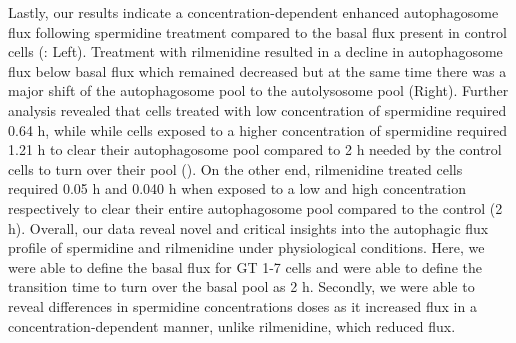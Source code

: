 {Lastly, our results indicate a concentration-dependent enhanced autophagosome flux following spermidine treatment compared to the basal flux present in control cells (: Left). Treatment with rilmenidine resulted in a decline in autophagosome flux below basal flux which remained decreased but at the same time there was a major shift of the autophagosome pool to the autolysosome pool  (Right). Further analysis revealed that cells treated with low concentration of spermidine required 0.64 h, while while cells exposed to a higher concentration of spermidine required 1.21 h to clear their autophagosome pool compared to 2 h needed by the control cells to turn over their pool (). On the other end, rilmenidine treated cells required 0.05 h and 0.040 h when exposed to a low and high concentration respectively to clear their entire autophagosome pool compared to the control (2 h). Overall, our data reveal novel and critical insights into the autophagic flux profile of spermidine and rilmenidine under physiological conditions. Here, we were able to define the basal flux for GT 1-7 cells and were able to define the transition time to turn over the basal pool as 2 h. Secondly, we were able to reveal differences in spermidine concentrations doses as it increased flux in a concentration-dependent manner, unlike rilmenidine, which reduced flux.

}
